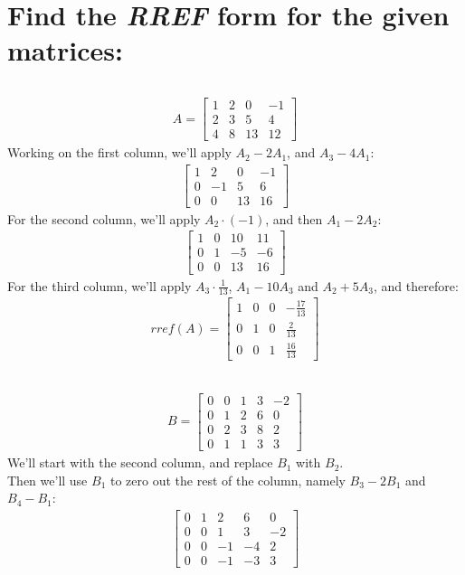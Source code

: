 \documentclass[a4paper, 12pt]{article}
\newcommand{\sub}[1]{\subsection{\underline{#1}}}
\newcommand{\?}{\stackrel{?}{=}}
\newcommand{\eq}[1]{\begin{align*}#1\end{align*}}
\begin{document}
\begin{titlepage}
\end{titlepage}

\setcounter{section}{3}
\section{Find the \textit{RREF} form for the given matrices:}
\sub{}
\eq{
    A=\begin{bmatrix}
        1&2&0&-1\\
        2&3&5&4\\
        4&8&13&12
    \end{bmatrix}
}
Working on the first column, we'll apply $A_2-2A_1$, and $A_3-4A_1$:
\eq{
    \begin{bmatrix}
        1&2&0&-1\\
        0&-1&5&6\\
        0&0&13&16
    \end{bmatrix}
}
For the second column, we'll apply $A_2\cdot(-1)$, and then $A_1-2A_2$:
\eq{
    \begin{bmatrix}
        1&0&10&11\\
        0&1&-5&-6\\
        0&0&13&16
    \end{bmatrix}
}
For the third column, we'll apply $A_3\cdot\frac{1}{13}$, $A_1-10A_3$ and $A_2+5A_3$, and therefore:
\eq{
    rref(A)=\begin{bmatrix}
        1&0&0&-\frac{17}{13}\\
        0&1&0&\frac{2}{13}\\
        0&0&1&\frac{16}{13}
    \end{bmatrix}
}
\sub{}
\eq{
    B=\begin{bmatrix}
        0&0&1&3&-2\\
        0&1&2&6&0\\
        0&2&3&8&2\\
        0&1&1&3&3
    \end{bmatrix}
}
We'll start with the second column, and replace $B_1$ with $B_2$.\\
Then we'll use $B_1$ to zero out the rest of the column, namely $B_3-2B_1$ and $B_4-B_1$:
\eq{\begin{bmatrix}
    0&1&2&6&0\\
    0&0&1&3&-2\\
    0&0&-1&-4&2\\
    0&0&-1&-3&3
\end{bmatrix}}
\end{document}
